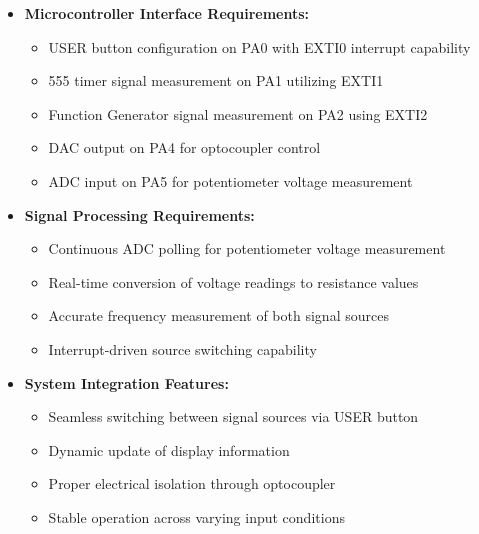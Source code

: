 \begin{itemize}[leftmargin=2em]
    \item \textbf{Microcontroller Interface Requirements:}
    \begin{itemize}
        \item USER button configuration on PA0 with EXTI0 interrupt capability
        \item 555 timer signal measurement on PA1 utilizing EXTI1
        \item Function Generator signal measurement on PA2 using EXTI2
        \item DAC output on PA4 for optocoupler control
        \item ADC input on PA5 for potentiometer voltage measurement
    \end{itemize}
    
    \item \textbf{Signal Processing Requirements:}
    \begin{itemize}
        \item Continuous ADC polling for potentiometer voltage measurement
        \item Real-time conversion of voltage readings to resistance values
        \item Accurate frequency measurement of both signal sources
        \item Interrupt-driven source switching capability
    \end{itemize}
    
    \item \textbf{System Integration Features:}
    \begin{itemize}
        \item Seamless switching between signal sources via USER button
        \item Dynamic update of display information
        \item Proper electrical isolation through optocoupler
        \item Stable operation across varying input conditions
    \end{itemize}


\end{itemize}
